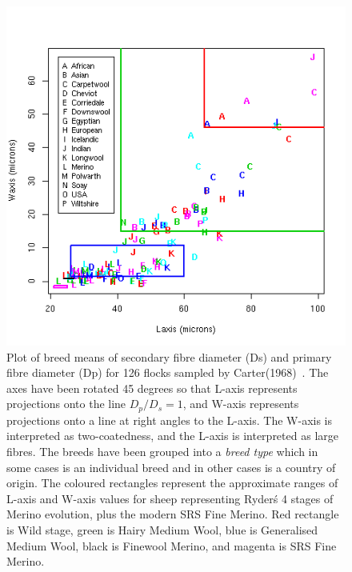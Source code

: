 %

\begin{figure}[!h]
  \centering
   \includegraphics[width=1.0\textwidth]{LWalltypea.png}
  \caption{Plot of breed means of secondary fibre diameter (Ds) and primary fibre diameter (Dp) for 126 flocks sampled by Carter(1968)~\cite{cart:68}. The axes have been rotated 45 degrees so that L-axis represents projections onto the line $D_{p}/D_{s} = 1$, and W-axis represents projections onto a line at right angles to the L-axis. The W-axis is interpreted as two-coatedness, and the L-axis is interpreted as large fibres. The breeds have been grouped into a {\em breed type} which in some cases is an individual breed and in other cases is a country of origin. The coloured rectangles represent  the approximate ranges of L-axis and W-axis values for sheep representing Ryder\'s 4 stages of Merino evolution, plus the modern SRS Fine Merino. Red rectangle is Wild stage, green is Hairy Medium Wool, blue is Generalised Medium Wool, black is Finewool Merino, and magenta is SRS Fine Merino.}
  \label{fig:LWalltypea}
\end{figure}

%

